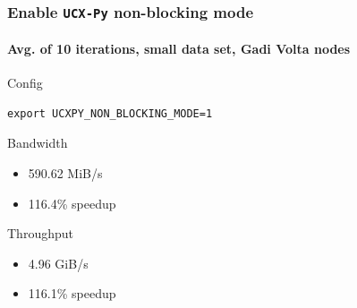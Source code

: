 \documentclass{beamer}
\begin{document}
\begin{frame}[fragile]
    \frametitle{Enable \texttt{UCX-Py} non-blocking mode}
    \framesubtitle{Avg. of 10 iterations, small data set, Gadi Volta nodes}
    
    \begin{exampleblock}{Config}
        \begin{lstlisting}
export UCXPY_NON_BLOCKING_MODE=1
        \end{lstlisting}
    \end{exampleblock}
    
    \begin{block}{Bandwidth}
        \begin{itemize}
            \item 590.62 MiB/s
            \item 116.4\% speedup
        \end{itemize}
    \end{block}
    
    \begin{alertblock}{Throughput}
        \begin{itemize}
            \item 4.96 GiB/s
            \item 116.1\% speedup
        \end{itemize}
    \end{alertblock}
\end{frame}
\end{document}
